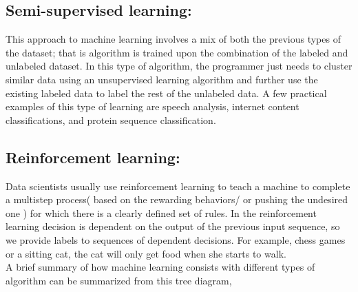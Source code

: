 \subsection{Semi-supervised learning:}
This approach to machine learning involves a mix of both the previous types of the dataset; that is algorithm is trained upon the combination of the labeled and unlabeled dataset.  In this type of algorithm, the programmer just needs to cluster similar data using an unsupervised learning algorithm and further use the existing labeled data to label the rest of the unlabeled data. A few practical examples of this type of learning are speech analysis, internet content classifications, and protein sequence classification\cite{Shental05semi-supervisedlearning}.


\subsection{Reinforcement learning: }
Data scientists usually use reinforcement learning to teach a machine to complete a multistep process( based on the rewarding behaviors/ or pushing the undesired one ) for which there is a clearly defined set of rules. In the reinforcement learning decision is dependent on the output of the previous input sequence, so we provide labels to sequences of dependent decisions. For example, chess games or a sitting cat, the cat will only get food when she starts to walk\cite{Thrun92efficientexploration}.\\

A brief summary of how machine learning consists with different types of algorithm can be summarized from this tree diagram,\\
%

